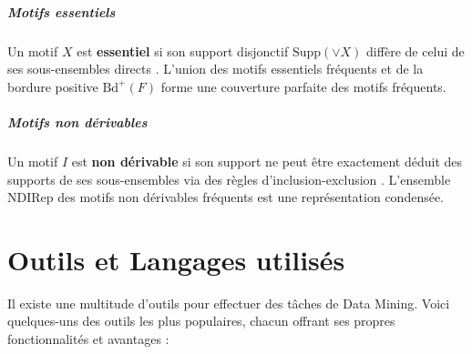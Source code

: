 \documentclass[a4paper,12pt]{report}
\begin{document}
        \paragraph{Motifs essentiels}
        
        Un motif \( X \) est \textbf{essentiel} si son support disjonctif \( \text{Supp}(\vee X) \) diffère de celui de ses sous-ensembles directs \cite{CCL05}. L’union des motifs essentiels fréquents et de la bordure positive \( \text{Bd}^+(F) \) forme une couverture parfaite des motifs fréquents.
        
        \paragraph{Motifs non dérivables}
        
        Un motif \( I \) est \textbf{non dérivable} si son support ne peut être exactement déduit des supports de ses sous-ensembles via des règles d’inclusion-exclusion \cite{CG06}. L’ensemble \( \text{NDIRep} \) des motifs non dérivables fréquents est une représentation condensée.
        
        

        


\chapter{Outils et Langages utilisés}
Il existe une multitude d’outils pour effectuer des tâches de Data Mining. Voici quelques-uns des outils les plus populaires, chacun offrant ses propres fonctionnalités et avantages :
\end{document}
